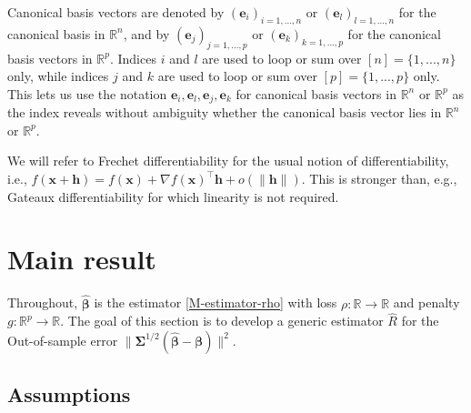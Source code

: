 \documentclass[11pt]{amsart}
\numberwithin{equation}{section}
\numberwithin{equation}{section}
\def\real{{\mathbb{R}}}
\def\R{{\real}}
\def\mathbold{\boldsymbol} %
\def\bh{\mathbold{h}}\def\hhat{\widehat{h}}\def\htil{\widetilde{h}}
\def\be{\mathbold{e}}
\def\bx{\mathbold{x}}\def\xhat{\widehat{x}}\def\xtil{\widetilde{x}}\def\xbar{{\overline x}}\def\vbx{{\bf x}}
\def\bbeta{\mathbold{\beta}}\def\betahat{\widehat{\beta}}\def\hbeta{\widehat{\beta}}
\def\hbbeta{{{\widehat{\bbeta}}}}
\def\bSigma{\mathbold{\Sigma}}\def\hbSigma{{\widehat{\bSigma}}}
\begin{document}
Canonical basis vectors are denoted by $(\be_i)_{i=1,...,n}$
or $(\be_l)_{l=1,...,n}$
for the canonical basis in $\R^n$, and
by $(\be_j)_{j=1,...,p}$ or $(\be_k)_{k=1,...,p}$
for the canonical basis vectors in $\R^p$.
Indices $i$ and $l$ are used to loop or sum over $[n]=\{1,...,n\}$ only,
while 
indices $j$ and $k$ are used to loop or sum over $[p]=\{1,...,p\}$ only.
This lets us use the notation $\be_i,\be_l, \be_j, \be_k$ for canonical
basis vectors in $\R^n$ or $\R^p$ as the index reveals without
ambiguity whether the canonical basis vector lies in $\R^n$ or $\R^p$.

We will refer to Frechet differentiability for the usual notion of differentiability, i.e., $f(\bx + \bh) = f(\bx) + \nabla f(\bx)^\top \bh + o(\|\bh\|)$.
This is stronger
than, e.g., Gateaux differentiability for which linearity is not required.

\section{Main result}
\label{sec:main}

Throughout, $\hbbeta$ is the estimator \eqref{M-estimator-rho}
with loss $\rho:\R\to\R$ and penalty $g:\R^p\to \R$.
The goal of this section is to develop a generic
estimator $\hat R$ for the Out-of-sample error $\|\bSigma^{1/2}(\hbbeta-\bbeta)\|^2$.

\subsection{Assumptions}
\end{document}
